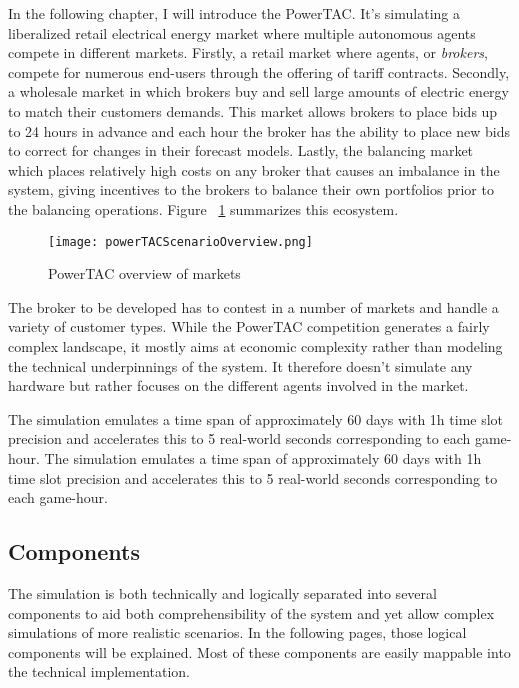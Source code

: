 In the following chapter, I will introduce the \acf{PowerTAC}. It's simulating a liberalized retail electrical energy
market where multiple autonomous agents compete in different markets. Firstly, a retail market where agents, or
\emph{brokers}, compete for numerous end-users through the offering of tariff contracts. Secondly, a wholesale market in
which brokers buy and sell large amounts of electric energy to match their customers demands. This market allows brokers
to place bids up to 24 hours in advance and each hour the broker has the ability to place new bids to correct for
changes in their forecast models. Lastly, the balancing market which places relatively high costs on any broker that
causes an imbalance in the system, giving incentives to the brokers to balance their own portfolios prior to the
balancing operations. Figure ~\ref{fig:powertacoverview} summarizes this ecosystem.

\begin{figure}[!h]%
    \texttt{[image: powerTACScenarioOverview.png]} \caption{PowerTAC overview of markets}
\label{fig:powertacoverview} \end{figure}


The broker to be developed has to contest in a number of markets and handle a variety of customer types. While the
\ac{PowerTAC} competition generates a fairly complex landscape, it mostly aims at economic complexity rather than
modeling the technical underpinnings of the system. It therefore doesn't simulate any hardware but rather focuses on the
different agents involved in the market.

The simulation emulates a time span of approximately 60 days with 1h time slot precision and accelerates this to 5
real-world seconds corresponding to each game-hour. The simulation emulates a time span of approximately 60 days with 1h
time slot precision and accelerates this to 5 real-world seconds corresponding to each game-hour.

\subsection{Components}

The simulation is both technically and logically separated into several components to aid both comprehensibility of the
system and yet allow complex simulations of more realistic scenarios. In the following pages, those logical components
will be explained. Most of these components are easily mappable into the technical implementation.

